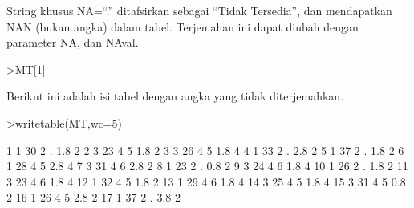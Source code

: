 \documentclass[a4paper,10pt]{article}
\begin{document}
\begin{eulernotebook}
\begin{eulercomment}
\begin{eulercomment}
\begin{eulercomment}
\begin{eulercomment}
\begin{eulercomment}
\begin{eulercomment}
\begin{eulercomment}
\begin{eulercomment}
\begin{eulercomment}
\begin{eulercomment}
\begin{eulercomment}
\begin{eulercomment}
\begin{eulercomment}
\begin{eulercomment}
\begin{eulercomment}
\begin{eulercomment}
\begin{eulercomment}
\begin{eulercomment}
\begin{eulercomment}
\begin{eulercomment}
\begin{eulercomment}
\begin{eulercomment}
\begin{eulercomment}
\begin{eulercomment}
\begin{eulercomment}
\begin{eulercomment}
\begin{eulercomment}
\begin{eulercomment}
\begin{eulercomment}
\begin{eulercomment}
\begin{eulercomment}
\begin{eulercomment}
\begin{eulercomment}
\begin{eulercomment}
\begin{eulercomment}
\begin{eulercomment}
\begin{eulercomment}
\begin{eulercomment}
\begin{eulercomment}
\begin{eulercomment}
\begin{eulercomment}
\begin{eulercomment}
\begin{eulercomment}
\begin{eulercomment}
\begin{eulercomment}
String khusus NA=“.” ditafsirkan sebagai “Tidak Tersedia”, dan
mendapatkan NAN (bukan angka) dalam tabel. Terjemahan ini dapat diubah
dengan parameter NA, dan NAval.
\end{eulercomment}
\begin{eulerprompt}
>MT[1]
\end{eulerprompt}
\begin{euleroutput}
  [1,  1,  30,  2,  NAN,  1.8,  2]
\end{euleroutput}
\begin{eulercomment}
Berikut ini adalah isi tabel dengan angka yang tidak diterjemahkan.
\end{eulercomment}
\begin{eulerprompt}
>writetable(MT,wc=5)
\end{eulerprompt}
\begin{euleroutput}
      1    1   30    2    .  1.8    2
      2    3   23    4    5  1.8    2
      3    3   26    4    5  1.8    4
      4    1   33    2    .  2.8    2
      5    1   37    2    .  1.8    2
      6    1   28    4    5  2.8    4
      7    3   31    4    6  2.8    2
      8    1   23    2    .  0.8    2
      9    3   24    4    6  1.8    4
     10    1   26    2    .  1.8    2
     11    3   23    4    6  1.8    4
     12    1   32    4    5  1.8    2
     13    1   29    4    6  1.8    4
     14    3   25    4    5  1.8    4
     15    3   31    4    5  0.8    2
     16    1   26    4    5  2.8    2
     17    1   37    2    .  3.8    2

\end{euleroutput}
\end{eulercomment}
\end{eulercomment}
\end{eulercomment}
\end{eulercomment}
\end{eulercomment}
\end{eulercomment}
\end{eulercomment}
\end{eulercomment}
\end{eulercomment}
\end{eulercomment}
\end{eulercomment}
\end{eulercomment}
\end{eulercomment}
\end{eulercomment}
\end{eulercomment}
\end{eulercomment}
\end{eulercomment}
\end{eulercomment}
\end{eulercomment}
\end{eulercomment}
\end{eulercomment}
\end{eulercomment}
\end{eulercomment}
\end{eulercomment}
\end{eulercomment}
\end{eulercomment}
\end{eulercomment}
\end{eulercomment}
\end{eulercomment}
\end{eulercomment}
\end{eulercomment}
\end{eulercomment}
\end{eulercomment}
\end{eulercomment}
\end{eulercomment}
\end{eulercomment}
\end{eulercomment}
\end{eulercomment}
\end{eulercomment}
\end{eulercomment}
\end{eulercomment}
\end{eulercomment}
\end{eulercomment}
\end{eulercomment}
\end{eulernotebook}
\end{document}
